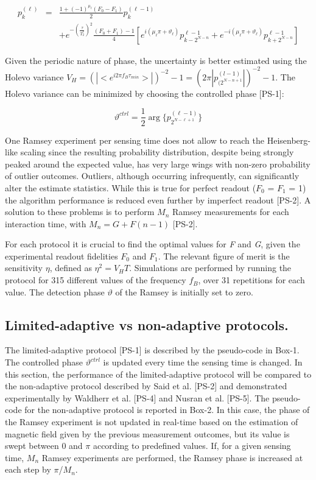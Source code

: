 \documentclass{report}
\begin{document}
\begin{eqnarray}
p_k^{(\ell)} &=& \frac{1 + (-1)^{\mu_{\ell}}(F_0-F_1)}{2}p_k^{(\ell-1)}\\
\nonumber
& &+e^{-(\frac{\tau}{T_2^*})^2} \frac{(F_0+F_1)-1}{4}[e^{i(\mu_{\ell}\pi+\vartheta_{\ell})}p^{\ell-1}_{k-2^{N-n}}+e^{-i(\mu_{\ell}\pi+\vartheta_{\ell})}p^{\ell-1}_{k+2^{N-n}}]
\end{eqnarray}


Given the periodic nature of phase, the uncertainty is better estimated using the Holevo variance $V_H = (|<e^{i 2 \pi f_B \tau_{min}} >|)^{-2}-1 = ( 2 \pi|p_{(2^{N-n+1}}^{(l-1)} |)^{-2}-1$. The Holevo variance can be minimized by choosing the controlled phase [PS-1]:

\begin{equation}
\vartheta^{ctrl} = \frac{1}{2}\arg\{ p_{2^{N-\ell+1}}^{(\ell - 1)}\}
\end{equation}
\clearpage

One Ramsey experiment per sensing time does not allow to reach the Heisenberg-like scaling since the resulting probability distribution, despite being strongly peaked around the expected value, has very large wings with non-zero probability of outlier outcomes. Outliers, although occurring infrequently, can significantly alter the estimate statistics. While this is true for perfect readout ($F_0$ = $F_1$ = 1) the algorithm performance is  reduced even further by imperfect readout [PS-2]. A solution to these problems is to perform $M_n$ Ramsey measurements for each interaction time, with $M_n = G + F(n-1)$ [PS-2]. 

For each protocol it is crucial to find the optimal values for \textit{F} and \textit{G}, given the experimental readout fidelities $F_0$ and $F_1$. The relevant figure of merit is the sensitivity $\eta$, defined as $\eta^2 = V_H T$.
Simulations are performed by running the protocol for 315 different values of the frequency $f_B$, over 31 repetitions for each value. The detection phase $\vartheta$ of the Ramsey is initially set to zero.

\subsection{Limited-adaptive vs non-adaptive protocols.} 
The limited-adaptive protocol [PS-1] is described by the pseudo-code in Box-1. The controlled phase $\vartheta^{ctrl}$ is updated every time the sensing time is changed. 
In this section, the performance of the limited-adaptive protocol will be compared to the non-adaptive protocol described by Said et al. [PS-2] and demonstrated experimentally by Waldherr et al. 
[PS-4] and Nusran et al. [PS-5]. The pseudo-code for the non-adaptive protocol is reported in Box-2. In this case, the phase of the Ramsey experiment is not updated in real-time based on the estimation of magnetic field given by the previous measurement outcomes, but its value is swept between 0 and $\pi$ according to predefined values. If, for a given sensing time, $M_n$ Ramsey experiments are performed, the Ramsey phase is increased at each step by $\pi$/$M_n$.
\end{document}
